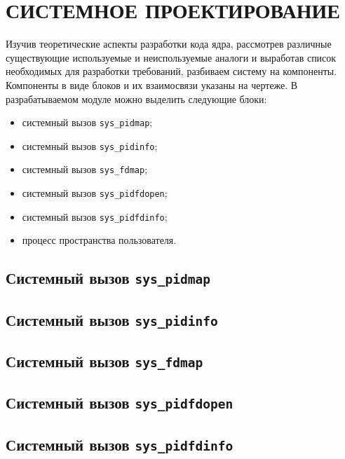 \section{СИСТЕМНОЕ ПРОЕКТИРОВАНИЕ}
\label{sec:sys}

Изучив теоретические аспекты разработки кода ядра, рассмотрев различные
существующие используемые и неиспользуемые аналоги и выработав список
необходимых для разработки требований, разбиваем систему на компоненты.
Компоненты в виде блоков и их взаимосвязи указаны на чертеже.
В разрабатываемом модуле можно выделить следующие блоки:
\begin{itemize}
\item системный вызов \texttt{sys\_pidmap};
\item системный вызов \texttt{sys\_pidinfo};
\item системный вызов \texttt{sys\_fdmap};
\item системный вызов \texttt{sys\_pidfdopen};
\item системный вызов \texttt{sys\_pidfdinfo};
\item процесс пространства пользователя.
\end{itemize}


\subsection{Системный вызов \texttt{sys\_pidmap}}
\label{sub:sys:sys_pidmap}


\subsection{Системный вызов \texttt{sys\_pidinfo}}
\label{sub:sys:sys_pidinfo}


\subsection{Системный вызов \texttt{sys\_fdmap}}
\label{sub:sys:sys_fdmap}


\subsection{Системный вызов \texttt{sys\_pidfdopen}}
\label{sub:sys:sys_pidfdopen}


\subsection{Системный вызов \texttt{sys\_pidfdinfo}}
\label{sub:sys:sys_pidfdinfo}

